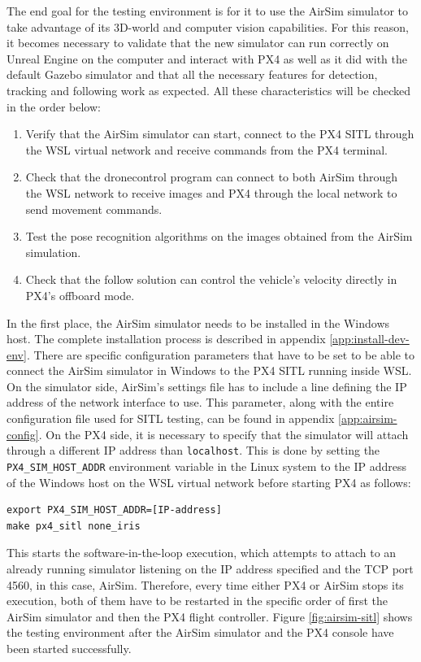 The end goal for the testing environment is for it to use the AirSim simulator to take advantage of its 3D-world and computer vision capabilities.
For this reason, it becomes necessary to validate that the new simulator can run correctly on Unreal Engine on the computer and interact with PX4 as well as it did with the default Gazebo simulator and that all the necessary features for detection, tracking and following work as expected.
All these characteristics will be checked in the order below:
\begin{enumerate}
    \item Verify that the AirSim simulator can start, connect to the PX4 SITL through the WSL virtual network and receive commands from the PX4 terminal.
    \item Check that the dronecontrol program can connect to both AirSim through the WSL network to receive images and PX4 through the local network to send movement commands.
    \item Test the pose recognition algorithms on the images obtained from the AirSim simulation.
    \item Check that the follow solution can control the vehicle's velocity directly in PX4's offboard mode.
\end{enumerate}

In the first place, the AirSim simulator needs to be installed in the Windows host.
The complete installation process is described in appendix \ref{app:install-dev-env}.
There are specific configuration parameters that have to be set to be able to connect the AirSim simulator in Windows to the PX4 SITL running inside WSL.
On the simulator side, AirSim's settings file has to include a line defining the IP address of the network interface to use.
This parameter, along with the entire configuration file used for SITL testing, can be found in appendix \ref{app:airsim-config}.
On the PX4 side, it is necessary to specify that the simulator will attach through a different IP address than \texttt{localhost}.
This is done by setting the \texttt{PX4\_SIM\_HOST\_ADDR} environment variable in the Linux system to the IP address of the Windows host on the WSL virtual network before starting PX4 as follows:
\begin{verbatim}
export PX4_SIM_HOST_ADDR=[IP-address]
make px4_sitl none_iris
\end{verbatim}
This starts the software-in-the-loop execution, which attempts to attach to an already running simulator listening on the IP address specified and the TCP port 4560, in this case, AirSim.
Therefore, every time either PX4 or AirSim stops its execution, both of them have to be restarted in the specific order of first the AirSim simulator and then the PX4 flight controller.
Figure \ref{fig:airsim-sitl} shows the testing environment after the AirSim simulator and the PX4 console have been started successfully.

